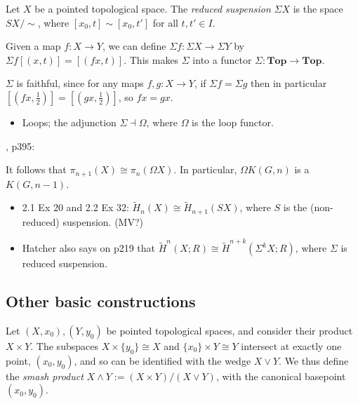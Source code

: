 \documentclass{MetricNotes2023}
\begin{document}
\begin{definition}
Let \(X\) be a pointed topological space. The \textit{reduced suspension} \(\Sigma X\) is the space \(SX/\sim\), where \([x_0, t]\sim [x_0, t']\) for all \(t,t'\in I\). 
\end{definition}

Given a map \(f : X \to Y\), we can define \(\Sigma f : \Sigma X \to \Sigma Y\) by \(\Sigma f[(x, t)]=[(fx, t)]\). This makes \(\Sigma \) into a functor \(\Sigma : \textbf{Top}\to \textbf{Top}\). 

\begin{remark}\label{2502141442}
\(\Sigma\) is faithful, since for any maps \(f, g : X\to Y\), if \(\Sigma f = \Sigma g\) then in particular \([(fx, \frac{1}{2})]=[(gx, \frac{1}{2})]\), so \(fx=gx\). 
\end{remark}  

\begin{itemize}
\item Loops; the adjunction \(\Sigma \dashv \Omega\), where \(\Omega\) is the loop functor.
\end{itemize}

\autocite{hatcher}, p395:

\begin{remark}
It follows that \(\pi_{n+1}(X)\cong \pi_n(\Omega X)\). In particular, \(\Omega K(G, n)\) is a \newline\(K(G, n-1)\). 
\end{remark}

\begin{itemize}
\item \autocite{hatcher} 2.1 Ex 20 and 2.2 Ex 32: \(\tilde H_n(X)\cong \tilde H_{n+1}(SX)\), where \(S\) is the (non-reduced) suspension.  (MV?) 
\item Hatcher also says on p219 that \(\tilde H^n(X;R)\cong \tilde H^{n+k}(\Sigma^kX;R)\), where \(\Sigma \) is reduced suspension.
\end{itemize}

\subsection{Other basic constructions}

\begin{definition}
Let \((X, x_0), (Y, y_0)\) be pointed topological spaces, and consider their product \(X\times Y\). The subspaces \(X\times\{y_0\}\cong X\) and \(\{x_0\}\times Y\cong Y\) intersect at exactly one point, \((x_0, y_0)\), and so can be identified with the wedge \(X\vee Y\). We thus define the \textit{smash product} \(X\wedge Y:=(X\times Y)/(X\vee Y)\), with the canonical basepoint \((x_0,y_0)\).  
\end{definition}
\end{document}
